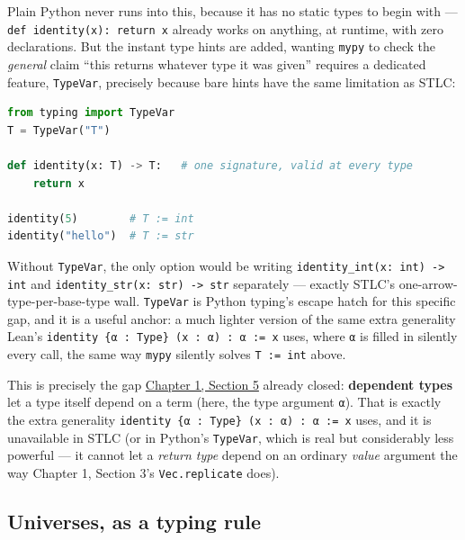 \begin{progcorner}

Plain Python never runs into this, because it has no static types to begin with --- \texttt{def identity(x): return x} already works on anything, at runtime, with zero declarations. But the instant type hints are added, wanting \texttt{mypy} to check the \emph{general} claim ``this returns whatever type it was given'' requires a dedicated feature, \texttt{TypeVar}, precisely because bare hints have the same limitation as STLC:

\end{progcorner}

\begin{lstlisting}[language=Python,style=python]
from typing import TypeVar
T = TypeVar("T")

def identity(x: T) -> T:   # one signature, valid at every type
    return x

identity(5)        # T := int
identity("hello")  # T := str
\end{lstlisting}

Without \texttt{TypeVar}, the only option would be writing \texttt{identity\_\allowbreak{}int(x: int) -\allowbreak{}> int} and \texttt{identity\_\allowbreak{}str(x: str) -\allowbreak{}> str} separately --- exactly STLC's one-arrow-type-per-base-type wall. \texttt{TypeVar} is Python typing's escape hatch for this specific gap, and it is a useful anchor: a much lighter version of the same extra generality Lean's \texttt{identity \{α : Type\} (x : α) : α := x} uses, where \texttt{α} is filled in silently every call, the same way \texttt{mypy} silently solves \texttt{T := int} above.

This is precisely the gap \hyperref[sec:01-basics:05-pi-sigma-and-coc:1]{Chapter 1, Section 5} already closed: \textbf{dependent types} let a type itself depend on a term (here, the type argument \texttt{α}). That is exactly the extra generality \texttt{identity \{α : Type\} (x : α) : α := x} uses, and it is unavailable in STLC (or in Python's \texttt{TypeVar}, which is real but considerably less powerful --- it cannot let a \emph{return type} depend on an ordinary \emph{value} argument the way Chapter 1, Section 3's \texttt{Vec.replicate} does).

\subsection{Universes, as a typing rule}\label{sec:05-rigor-check:03-typing-rules-and-safety:7}

